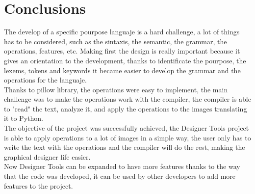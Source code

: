 \section{Conclusions}
The develop of a specific pourpose languaje is a hard challenge, a lot of things has to be considered, such as the sintaxis, the semantic, the grammar, the operations, features, etc. Making first the design is really important because it gives an orientation to the development, thanks to identificate the pourpose, the lexems, tokens and keywords it became easier to develop the grammar and the operations for the languaje.\\
Thanks to pillow library, the operations were easy to implement, the main challenge was to make the operations work with the compiler, the compiler is able to "read" the text, analyze it, and apply the operations to the images translating it to Python.\\
The objective of the project was successfully achieved, the Designer Tools project is able to apply operations to a lot of images in a simple way, the user only has to write the text with the operations and the compiler will do the rest, making the graphical designer life easier.\\
Now Designer Tools can be expanded to have more features thanks to the way that the code was developed, it can be used by other developers to add more features to the project.\\